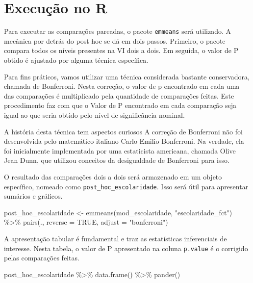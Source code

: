 \documentclass[
]{book}
\newenvironment{Shaded}{\begin{snugshade}}{\end{snugshade}}
\newcommand{\AttributeTok}[1]{\textcolor[rgb]{0.77,0.63,0.00}{#1}}
\newcommand{\ConstantTok}[1]{\textcolor[rgb]{0.00,0.00,0.00}{#1}}
\newcommand{\FunctionTok}[1]{\textcolor[rgb]{0.00,0.00,0.00}{#1}}
\newcommand{\NormalTok}[1]{#1}
\newcommand{\OtherTok}[1]{\textcolor[rgb]{0.56,0.35,0.01}{#1}}
\newcommand{\SpecialCharTok}[1]{\textcolor[rgb]{0.00,0.00,0.00}{#1}}
\newcommand{\StringTok}[1]{\textcolor[rgb]{0.31,0.60,0.02}{#1}}
\begin{document}
\hypertarget{execuuxe7uxe3o-no-r-7}{%
\section{Execução no R}\label{execuuxe7uxe3o-no-r-7}}

Para executar as comparações pareadas, o pacote \texttt{emmeans} será utilizado. A mecânica por detrás do post hoc se dá em dois passos. Primeiro, o pacote compara todos os níveis presentes na VI dois a dois. Em seguida, o valor de P obtido é ajustado por alguma técnica específica.

Para fins práticos, vamos utilizar uma técnica considerada bastante conservadora, chamada de Bonferroni. Nesta correção, o valor de p encontrado em cada uma das comparações é multiplicado pela quantidade de comparações feitas. Este procedimento faz com que o Valor de P encontrado em cada comparação seja igual ao que seria obtido pelo nível de significância nominal.

A história desta técnica tem aspectos curiosos A correção de Bonferroni não foi desenvolvida pelo matemático italiano Carlo Emilio Bonferroni. Na verdade, ela foi inicialmente implementada por uma estaticista americana, chamada Olive Jean Dunn, que utilizou conceitos da desigualdade de Bonferroni para isso.

O resultado das comparações dois a dois será armazenado em um objeto específico, nomeado como \texttt{post\_hoc\_escolaridade}. Isso será útil para apresentar sumários e gráficos.

\begin{Shaded}
\begin{Highlighting}[]
\NormalTok{post\_hoc\_escolaridade }\OtherTok{\textless{}{-}} \FunctionTok{emmeans}\NormalTok{(mod\_escolaridade, }
                                 \StringTok{"escolaridade\_fct"}\NormalTok{) }\SpecialCharTok{\%\textgreater{}\%} 
  \FunctionTok{pairs}\NormalTok{(., }\AttributeTok{reverse =} \ConstantTok{TRUE}\NormalTok{, }\AttributeTok{adjust =} \StringTok{"bonferroni"}\NormalTok{)}
\end{Highlighting}
\end{Shaded}

A apresentação tabular é fundamental e traz as estatísticas inferenciais de interesse. Nesta tabela, o valor de P apresentado na coluna \texttt{p.value} é o corrigido pelas comparações feitas.

\begin{Shaded}
\begin{Highlighting}[]
\NormalTok{post\_hoc\_escolaridade }\SpecialCharTok{\%\textgreater{}\%} 
  \FunctionTok{data.frame}\NormalTok{() }\SpecialCharTok{\%\textgreater{}\%} 
  \FunctionTok{pander}\NormalTok{()}
\end{Highlighting}
\end{Shaded}
\end{document}
